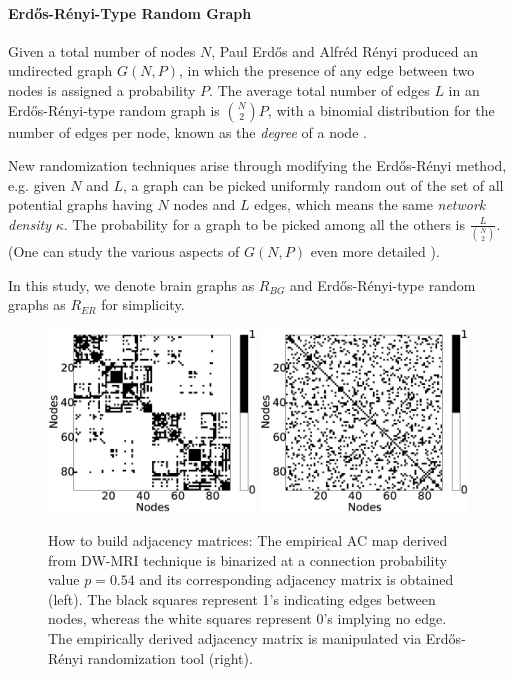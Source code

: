 \documentclass[fleqn,10pt]{wlpeerj}
\begin{document}
\paragraph{Erd\H{o}s-R\'{e}nyi-Type Random Graph}

Given a total number of nodes $N$, Paul Erd\H{o}s and Alfr\'{e}d R\'{e}nyi produced an undirected graph $G(N,P)$, in which the presence of any edge between two nodes is assigned a probability $P$. 
The average total number of edges $L$ in an  Erd\H{o}s-R\'{e}nyi-type random graph is $\binom {N} {2}P$, with a binomial distribution for the number of edges per node, known as the \textit{degree} of a node \citep{XYZERD}. 

New randomization techniques arise through modifying the Erd\H{o}s-R\'{e}nyi method, e.g. given $N$ and $L$, a graph can be picked uniformly random out of the set of all potential graphs having $N$ nodes and $L$ edges, which means the same \textit{network density} $\kappa$. The probability for a graph to be picked among all the others is $\frac{L}{\binom {N}{2}}$. (One can study the various aspects of $G(N,P)$ even more detailed \citep{NEW10}). 

In this study, we denote brain graphs as $R_{BG}$ and Erd\H{o}s-R\'{e}nyi-type random graphs as $R_{ER}$ for simplicity.

\begin{figure}[htpb]\centering
	\includegraphics[width=0.49\textwidth]{Figures/Adj_ACM.eps}	 
	\includegraphics[width=0.49\textwidth]{Figures/Adj_ER.eps} 
	  
\caption{How to build adjacency matrices: The empirical AC map derived from DW-MRI technique is binarized at a connection probability value $p=0.54$ and its corresponding adjacency matrix is obtained (left). The black squares represent 1's indicating edges between nodes, whereas the white squares represent 0's implying no edge. The empirically derived adjacency matrix is manipulated via Erd\H{o}s-R\'{e}nyi randomization tool (right).}

\label{fig:Binarizing via Thresholding}
\end{figure}
\end{document}
